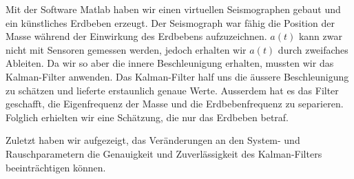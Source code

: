 Mit der Software Matlab haben wir einen virtuellen Seismographen gebaut und ein künstliches Erdbeben erzeugt.
Der Seismograph war fähig die Position der Masse während der Einwirkung des Erdbebens aufzuzeichnen.
$a(t)$ kann zwar nicht mit Sensoren gemessen werden, jedoch erhalten wir $a(t)$ durch zweifaches Ableiten.
Da wir so aber die innere Beschleunigung erhalten, mussten wir das Kalman-Filter anwenden.
Das Kalman-Filter half uns die äussere Beschleunigung zu schätzen und lieferte erstaunlich genaue Werte.
Ausserdem hat es das Filter geschafft, die Eigenfrequenz der Masse und die Erdbebenfrequenz zu separieren.
Folglich erhielten wir eine Schätzung, die nur das Erdbeben betraf.

Zuletzt haben wir aufgezeigt, das Veränderungen an den System- und Rauschparametern die Genauigkeit und Zuverlässigkeit des Kalman-Filters beeinträchtigen können.


